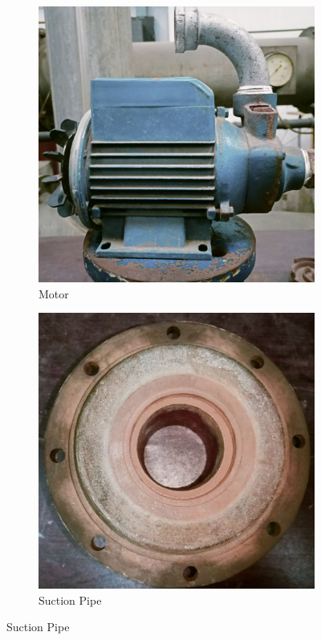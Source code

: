 \documentclass[12pt]{article}
\begin{document}
\begin{figure}
\begin{subfigure}{0.3\textwidth}
      \includegraphics[width=\linewidth]{img/p_02.jpg}
      \caption{Motor}
  \end{subfigure}
  \hfill
  \begin{subfigure}{0.3\textwidth}
      \includegraphics[width=\linewidth]{img/p_03.jpg}
      \caption{Suction Pipe}
  \end{subfigure}


\end{figure}
\end{document}
